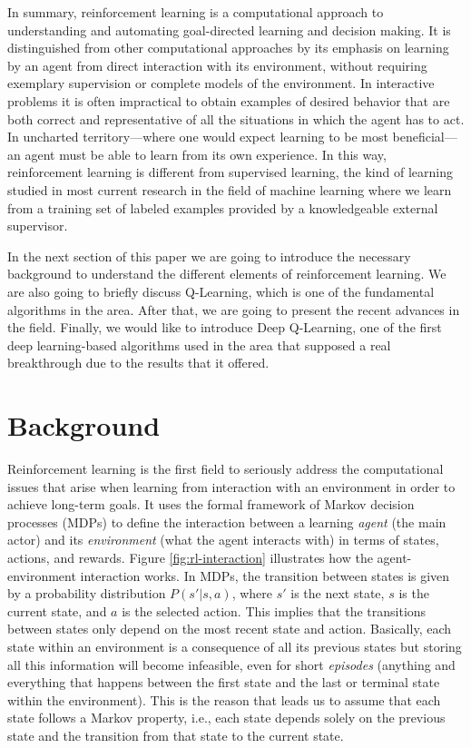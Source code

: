 \documentclass{article}
\begin{document}
In summary, reinforcement learning is a computational approach to understanding and automating
goal-directed learning and decision making. It is distinguished from other computational
approaches by its emphasis on learning by an agent from direct interaction with its
environment, without requiring exemplary supervision or complete models of the environment.
In interactive problems it is often impractical to obtain examples of desired behavior that are
both correct and representative of all the situations in which the agent has to act. In uncharted
territory—where one would expect learning to be most beneficial—an agent must be able to learn from
its own experience. In this way, reinforcement learning is different from supervised learning, the
kind of learning studied in most current research in the field of machine learning where we learn
from a training set of labeled examples provided by a knowledgeable external supervisor.

In the next section of this paper we are going to introduce the necessary background to understand
the different elements of reinforcement learning. We are also going to briefly discuss Q-Learning,
which is one of the fundamental algorithms in the area. After that, we are going to present
the recent advances in the field. Finally, we would like to introduce Deep Q-Learning, one
of the first deep learning-based algorithms used in the area that supposed a real breakthrough
due to the results that it offered.

\section{Background}

Reinforcement learning is the first field to seriously address the computational issues that arise
when learning from interaction with an environment in order to achieve long-term goals. It uses the
formal framework of Markov decision processes (MDPs) to define the interaction between a learning
\emph{agent} (the main actor) and its \emph{environment} (what the agent interacts with)
in terms of states, actions, and rewards. Figure \ref{fig:rl-interaction} illustrates how the
agent-environment interaction works. In MDPs, the transition between states is given
by a probability distribution $P(s' | s, a)$, where $s'$ is the next state, $s$ is the
current state, and $a$ is the selected action. This implies that the transitions
between states only depend on the most recent state and action. Basically, each state within an
environment is a consequence of all its previous states but storing all this information will become
infeasible, even for short \emph{episodes} (anything and everything that happens between the first state
and the last or terminal state within the environment). This is the reason that leads us to assume that
each state follows a Markov property, i.e., each state depends solely on the previous state and the
transition from that state to the current state.
\end{document}
